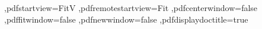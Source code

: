 {{  ,pdfstartview=FitV      %
  ,pdfremotestartview=Fit %
  ,pdfcenterwindow=false  %
  ,pdffitwindow=false     %
  ,pdfnewwindow=false     %
  ,pdfdisplaydoctitle=true  %
} %
\usepackage{footnotebackref}
} %
